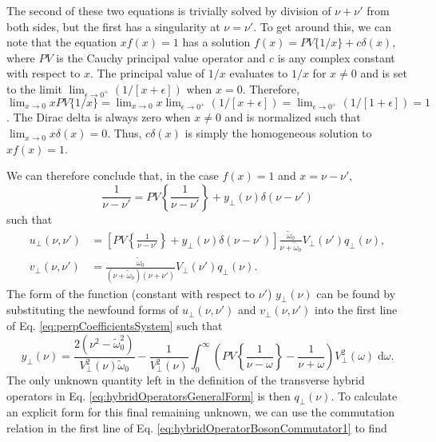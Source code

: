 \documentclass{article}
\begin{document}
The second of these two equations is trivially solved by division of $\nu + \nu'$ from both sides, but the first has a singularity at $\nu = \nu'$. To get around this, we can note that the equation $xf(x) = 1$ has a solution $f(x) = PV\{1/x\} + c\delta(x)$, where $PV$ is the Cauchy principal value operator and $c$ is any complex constant with respect to $x$. The principal value of $1/x$ evaluates to $1/x$ for $x\neq0$ and is set to the limit $\lim_{\epsilon\to0^+}(1/[x + \epsilon])$ when $x = 0$. Therefore, $\lim_{x\to0}xPV\{1/x\} = \lim_{x\to0}x\lim_{\epsilon\to0^+}(1/[x + \epsilon]) = \lim_{\epsilon\to0^+}(1/[1+\epsilon]) = 1$. The Dirac delta is always zero when $x\neq0$ and is normalized such that $\lim_{x\to0}x\delta(x) = 0$. Thus, $c\delta(x)$ is simply the homogeneous solution to $xf(x) = 1$. 

We can therefore conclude that, in the case $f(x) = 1$ and $x = \nu - \nu'$,
\begin{equation}
\frac{1}{\nu - \nu'} = PV\left\{\frac{1}{\nu - \nu'}\right\} + y_\perp(\nu)\delta(\nu - \nu')
\end{equation}
such that
\begin{equation}
\begin{split}
u_\perp(\nu,\nu') &= \left[PV\left\{\frac{1}{\nu - \nu'}\right\} + y_\perp(\nu)\delta(\nu - \nu')\right]\frac{\tilde{\omega}_0}{\nu + \tilde{\omega}_0}V_\perp(\nu')q_\perp(\nu),\\
v_\perp(\nu,\nu') &= \frac{\tilde{\omega}_0}{(\nu + \tilde{\omega}_0)(\nu + \nu')}V_\perp(\nu')q_\perp(\nu).
\end{split}
\end{equation}
The form of the function (constant with respect to $\nu'$) $y_\perp(\nu)$ can be found by substituting the newfound forms of $u_\perp(\nu,\nu')$ and $v_\perp(\nu,\nu')$ into the first line of Eq. \eqref{eq:perpCoefficientsSystem} such that
\begin{equation}
y_\perp(\nu) = \frac{2(\nu^2 - \tilde{\omega}_0^2)}{V_\perp^2(\nu)\tilde{\omega}_0} - \frac{1}{V_\perp^2(\nu)}\int_0^\infty\left(PV\left\{\frac{1}{\nu - \omega}\right\} - \frac{1}{\nu + \omega}\right)V_\perp^2(\omega)\;\mathrm{d}\omega.
\end{equation}
The only unknown quantity left in the definition of the transverse hybrid operators in Eq. \eqref{eq:hybridOperatorsGeneralForm} is then $q_\perp(\nu)$. To calculate an explicit form for this final remaining unknown, we can use the commutation relation in the first line of Eq. \eqref{eq:hybridOperatorBosonCommutator1} to find
\end{document}
